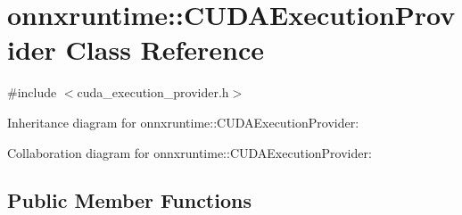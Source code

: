 \hypertarget{classonnxruntime_1_1CUDAExecutionProvider}{}\section{onnxruntime\+:\+:C\+U\+D\+A\+Execution\+Provider Class Reference}
\label{classonnxruntime_1_1CUDAExecutionProvider}


{\ttfamily \#include $<$cuda\+\_\+execution\+\_\+provider.\+h$>$}



Inheritance diagram for onnxruntime\+:\+:C\+U\+D\+A\+Execution\+Provider\+:


Collaboration diagram for onnxruntime\+:\+:C\+U\+D\+A\+Execution\+Provider\+:
\subsection*{Public Member Functions}
